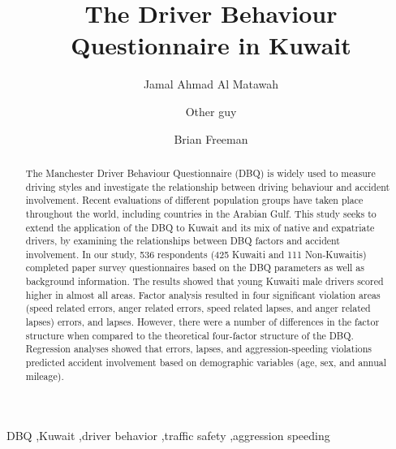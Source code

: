 \documentclass[preprint,12pt,a4paper,authoryear]{elsarticle}
\title{The Driver Behaviour Questionnaire in Kuwait}
\begin{document}
\maketitle

\begin{frontmatter}

\author[add1]{Jamal Ahmad Al Matawah }
\author[add2]{Other guy}
\author[add3]{Brian Freeman}


\address[add1]{Public Authority for Applied Education and Training, Dept of Civil Engineering, Kuwait}
\address[add2]{Jordan}
\address[add3]{School of Engineering, University of Guelph, Guelph, Ontario, N1G 2W1, Canada}


\begin{abstract}
The Manchester Driver Behaviour Questionnaire (DBQ) is widely used to measure driving styles and investigate the relationship between driving behaviour and accident involvement. Recent evaluations of different population groups have taken place throughout the world, including countries in the Arabian Gulf. This study seeks to extend the application of the DBQ to Kuwait and its mix of native and expatriate drivers, by examining the relationships between DBQ factors and accident involvement.  In our study, 536 respondents (425  Kuwaiti and 111 Non-Kuwaitis) completed paper survey questionnaires based on the DBQ parameters as well as background information. The results showed that young Kuwaiti male drivers scored higher in almost all areas. Factor analysis resulted in four significant violation areas (speed related  errors, anger related  errors, speed related lapses, and anger related lapses) errors, and lapses. However, there were a number of differences in the factor structure when compared to the theoretical four-factor structure of the DBQ.  Regression analyses showed that errors, lapses, and aggression-speeding violations predicted accident involvement based on demographic variables (age, sex, and annual mileage).
\\

\end{abstract}

\begin{keyword}
DBQ \sep Kuwait \sep driver behavior \sep traffic safety \sep aggression speeding 
\end{keyword}

\end{frontmatter}
 
\end{document}
